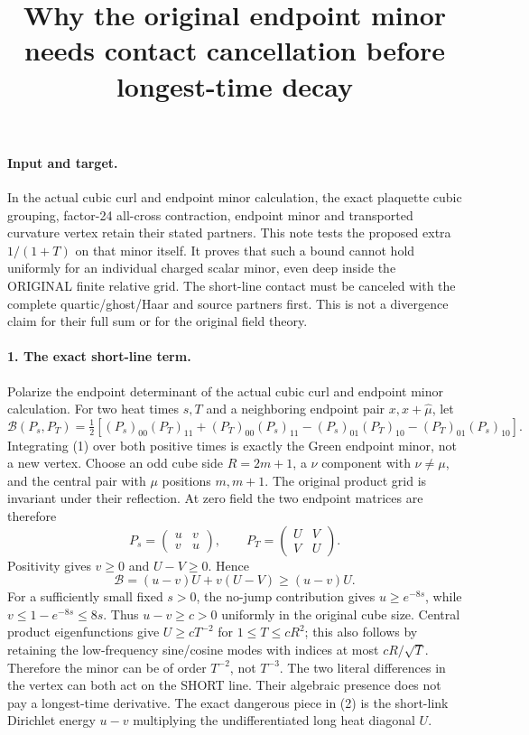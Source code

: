 \documentclass[11pt]{article}
\title{Why the original endpoint minor needs contact cancellation before longest-time decay}\author{}\date{}
\begin{document}
\maketitle
\paragraph{Input and target.}
In the actual cubic curl and endpoint minor calculation, the exact plaquette cubic grouping, factor-24 all-cross
contraction, endpoint minor and transported curvature vertex retain their
stated partners. This note tests the proposed extra $1/(1+T)$ on that
minor itself. It proves that such a bound cannot hold uniformly for an
individual charged scalar minor, even deep inside the ORIGINAL finite
relative grid. The short-line contact must be canceled with the complete
quartic/ghost/Haar and source partners first. This is not a divergence
claim for their full sum or for the original field theory.

\paragraph{1. The exact short-line term.}
Polarize the endpoint determinant of the actual cubic curl and endpoint minor calculation. For two heat times $s,T$
and a neighboring endpoint pair $x,x+\hat\mu$, let
\[
 \mathcal B(P_s,P_T)=\tfrac12[
 (P_s)_{00}(P_T)_{11}+(P_T)_{00}(P_s)_{11}
 -(P_s)_{01}(P_T)_{10}-(P_T)_{01}(P_s)_{10}].                       \tag{1}
\]
Integrating (1) over both positive times is exactly the Green endpoint
minor, not a new vertex.
Choose an odd cube side $R=2m+1$, a $\nu$ component with $\nu\ne\mu$,
and the central pair with $\mu$ positions $m,m+1$. The original product
grid is invariant under their reflection. At zero field the two endpoint
matrices are therefore
\[
 P_s=\begin{pmatrix}u&v\\v&u\end{pmatrix},\qquad
 P_T=\begin{pmatrix}U&V\\V&U\end{pmatrix}.
\]
Positivity gives $v\ge0$ and $U-V\ge0$. Hence
\[
 \boxed{\mathcal B=(u-v)U+v(U-V)\ge(u-v)U.}                       \tag{2}
\]
For a sufficiently small fixed $s>0$, the no-jump contribution gives
$u\ge e^{-8s}$, while $v\le1-e^{-8s}\le8s$. Thus $u-v\ge c>0$
uniformly in the original cube size. Central product eigenfunctions give
$U\ge cT^{-2}$ for $1\le T\le cR^2$; this also follows by retaining the
low-frequency sine/cosine modes with indices at most $cR/\sqrt T$.
Therefore the minor can be of order $T^{-2}$, not $T^{-3}$.
The two literal differences in the vertex can both act on the SHORT
line. Their algebraic presence does not pay a longest-time derivative.
The exact dangerous piece in (2) is the short-link Dirichlet energy
$u-v$ multiplying the undifferentiated long heat diagonal $U$.
\end{document}

